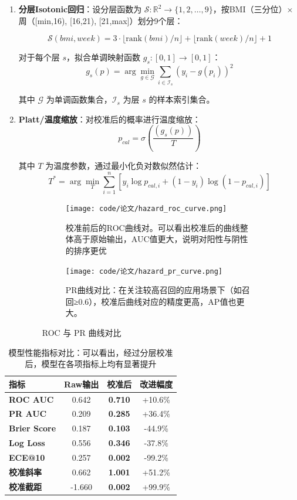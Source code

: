 \documentclass[12pt,a4paper]{ctexart}
\numberwithin{equation}{section}
\theoremstyle{mcm}
\begin{document}
\begin{enumerate}
\item \textbf{分层Isotonic回归}：设分层函数为 $\mathcal{S}: \mathbb{R}^2 \rightarrow \{1, 2, \ldots, 9\}$，按BMI（三分位）×周（[min,16), [16,21), [21,max]）划分9个层：

   $$\mathcal{S}(bmi, week) = 3 \cdot \lfloor \text{rank}(bmi)/n \rfloor + \lfloor \text{rank}(week)/n \rfloor + 1$$

   对于每个层 $s$，拟合单调映射函数 $g_s: [0,1] \rightarrow [0,1]$：
   $$g_s(p) = \arg\min_{g \in \mathcal{G}} \sum_{i \in \mathcal{I}_s} (y_i - g(p_i))^2$$
   
   其中 $\mathcal{G}$ 为单调函数集合，$\mathcal{I}_s$ 为层 $s$ 的样本索引集合。

\item \textbf{Platt/温度缩放}：对校准后的概率进行温度缩放：
   $$p_{cal} = \sigma\left(\frac{(g_s(p))}{T}\right)$$
   
   其中 $T$ 为温度参数，通过最小化负对数似然估计：
   $$T^* = \arg\min_T \sum_{i=1}^n [y_i \log p_{cal,i} + (1-y_i) \log(1-p_{cal,i})]$$
\begin{figure}[H]\centering
  \begin{subfigure}[t]{.48\linewidth}
    \texttt{[image: code/论文/hazard\_roc\_curve.png]}
    \caption{校准前后的ROC曲线对。可以看出校准后的曲线整体高于原始输出，AUC值更大，说明对阳性与阴性的排序更优}
    \label{fig:roc}
  \end{subfigure}\hfill%
  \begin{subfigure}[t]{.48\linewidth}
    \texttt{[image: code/论文/hazard\_pr\_curve.png]}
    \caption{PR曲线对比：在关注较高召回的应用场景下（如召回≥0.6），校准后曲线对应的精度更高，AP值也更大。}
    \label{fig:pr}
  \end{subfigure}
  \caption{ROC 与 PR 曲线对比}
  \label{fig:roc_pr_pair}
\end{figure}
\end{enumerate}
\begin{table}[H]
\centering
\caption{模型性能指标对比：可以看出，经过分层校准后，模型在各项指标上均有显著提升}
\label{tab:performance}
\begin{tabular}{@{}lccc@{}}
\toprule
指标 & Raw输出 & 校准后 & 改进幅度 \\
\midrule
\textbf{ROC AUC} & 0.642 & \textbf{0.710} & +10.6\% \\
\textbf{PR AUC} & 0.209 & \textbf{0.285} & +36.4\% \\
\textbf{Brier Score} & 0.187 & \textbf{0.103} & -44.9\% \\
\textbf{Log Loss} & 0.556 & \textbf{0.346} & -37.8\% \\
\textbf{ECE@10} & 0.257 & \textbf{0.002} & -99.2\% \\
\textbf{校准斜率} & 0.662 & \textbf{1.001} & +51.2\% \\
\textbf{校准截距} & -1.660 & \textbf{0.002} & +99.9\% \\
\bottomrule
\end{tabular}
\end{table}
\end{document}
